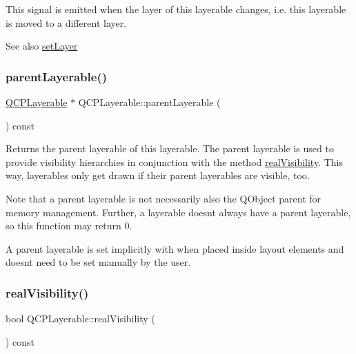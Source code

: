 This signal is emitted when the layer of this layerable changes, i.\+e. this layerable is moved to a different layer.

\begin{DoxySeeAlso}{See also}
\hyperlink{class_q_c_p_layerable_ab0d0da6d2de45a118886d2c8e16d5a54}{set\+Layer} 
\end{DoxySeeAlso}
\hypertarget{class_q_c_p_layerable_aa78b7e644d2c519e1a9a6f2ac5fcd858}{}\label{class_q_c_p_layerable_aa78b7e644d2c519e1a9a6f2ac5fcd858} 
\subsubsection{\texorpdfstring{parent\+Layerable()}{parentLayerable()}}
{\footnotesize\ttfamily \hyperlink{class_q_c_p_layerable}{Q\+C\+P\+Layerable} $\ast$ Q\+C\+P\+Layerable\+::parent\+Layerable (\begin{DoxyParamCaption}{ }\end{DoxyParamCaption}) const\hspace{0.3cm}{\ttfamily [inline]}}

Returns the parent layerable of this layerable. The parent layerable is used to provide visibility hierarchies in conjunction with the method \hyperlink{class_q_c_p_layerable_ab054e88f15d485defcb95e7376f119e7}{real\+Visibility}. This way, layerables only get drawn if their parent layerables are visible, too.

Note that a parent layerable is not necessarily also the Q\+Object parent for memory management. Further, a layerable doesn\textquotesingle{}t always have a parent layerable, so this function may return 0.

A parent layerable is set implicitly with when placed inside layout elements and doesn\textquotesingle{}t need to be set manually by the user. \hypertarget{class_q_c_p_layerable_ab054e88f15d485defcb95e7376f119e7}{}\label{class_q_c_p_layerable_ab054e88f15d485defcb95e7376f119e7} 
\subsubsection{\texorpdfstring{real\+Visibility()}{realVisibility()}}
{\footnotesize\ttfamily bool Q\+C\+P\+Layerable\+::real\+Visibility (\begin{DoxyParamCaption}{ }\end{DoxyParamCaption}) const}

